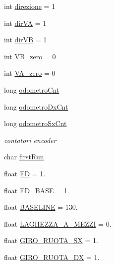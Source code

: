 \begin{DoxyCompactItemize}
\item 
int \mbox{\hyperlink{ari_pi__2_d_c__esp__08_8ino_a6505c8e9ac66c5a6ac679bc41647f100}{direzione}} = 1
\item 
int \mbox{\hyperlink{ari_pi__2_d_c__esp__08_8ino_a6e9c7be6c7c4f653f9d3ca70006130e6}{dir\+VA}} = 1
\item 
int \mbox{\hyperlink{ari_pi__2_d_c__esp__08_8ino_aaf30ecc1398dffba96805a9ce60d1480}{dir\+VB}} = 1
\item 
int \mbox{\hyperlink{ari_pi__2_d_c__esp__08_8ino_aa57b545b28e726dc370d6afd59930221}{V\+B\+\_\+zero}} = 0
\item 
int \mbox{\hyperlink{ari_pi__2_d_c__esp__08_8ino_a57bf2119e3e83782219233e9bd8b0125}{V\+A\+\_\+zero}} = 0
\item 
long \mbox{\hyperlink{ari_pi__2_d_c__esp__08_8ino_a4e6edab3c135f74217f544821dbb3a49}{odometro\+Cnt}}
\item 
long \mbox{\hyperlink{ari_pi__2_d_c__esp__08_8ino_a0ac82b55ed4fe13596eeffa61bb06685}{odometro\+Dx\+Cnt}}
\item 
long \mbox{\hyperlink{ari_pi__2_d_c__esp__08_8ino_ab4ce4d95d7983a12a924f49196f9b9a5}{odometro\+Sx\+Cnt}}
\begin{DoxyCompactList}\small\item\em contatori encoder \end{DoxyCompactList}\item 
char \mbox{\hyperlink{ari_pi__2_d_c__esp__08_8ino_a7acc771f00b743e5b3e0d2512eb5329b}{first\+Run}}
\item 
float \mbox{\hyperlink{ari_pi__2_d_c__esp__08_8ino_a46145722dc21eed1a702b867ced59e49}{ED}} = 1.
\item 
float \mbox{\hyperlink{ari_pi__2_d_c__esp__08_8ino_aab9585a72373b934a8e78ac806c57f50}{E\+D\+\_\+\+B\+A\+SE}} = 1.
\item 
float \mbox{\hyperlink{ari_pi__2_d_c__esp__08_8ino_a9c5bc38bd76775bbcb1e430646060ca5}{B\+A\+S\+E\+L\+I\+NE}} = 130.
\item 
float \mbox{\hyperlink{ari_pi__2_d_c__esp__08_8ino_a023cb7e635b51ac94b3e22f2b6ac8f9c}{L\+A\+G\+H\+E\+Z\+Z\+A\+\_\+\+A\+\_\+\+M\+E\+Z\+ZI}} = 0.
\item 
float \mbox{\hyperlink{ari_pi__2_d_c__esp__08_8ino_aeee767366b9e5e9bb8022b27fcbb7e68}{G\+I\+R\+O\+\_\+\+R\+U\+O\+T\+A\+\_\+\+SX}} = 1.
\item 
float \mbox{\hyperlink{ari_pi__2_d_c__esp__08_8ino_a87caded4c49d6deea703487e7f11d9e3}{G\+I\+R\+O\+\_\+\+R\+U\+O\+T\+A\+\_\+\+DX}} = 1.
\item 

\end{DoxyCompactItemize}
